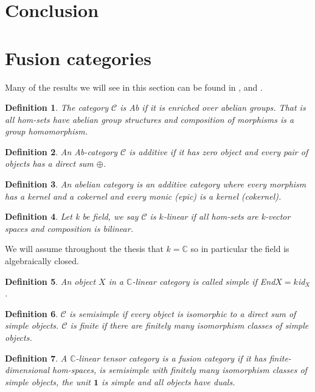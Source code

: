 \documentclass{article}
\newtheorem{definition}{Definition}
\begin{document}
\section{Conclusion}




\appendix
	\section{Fusion categories}
	Many of the results we will see in this section can be found in \cite{Mueger08}, \cite{Bartlett15} and \cite{Freyd66}.
	\begin{definition}
		The category $\mathcal{C}$ is Ab if it is enriched over abelian groups. That is all hom-sets have abelian group structures and composition of morphisms is a group homomorphism. 
	\end{definition}
	\begin{definition}
		An Ab-category $\mathcal{C}$ is additive if it has zero object and every pair of objects has a direct sum $\oplus$.
	\end{definition}
	\begin{definition}
		An abelian category is an additive category where every morphism has a kernel and a cokernel and every monic (epic) is a kernel (cokernel).
	\end{definition}
	\begin{definition}
		Let k be field, we say $\mathcal{C}$ is $k$-linear if all hom-sets are k-vector spaces and composition is bilinear.
	\end{definition}
	We will assume throughout the thesis that $k=\mathbb{C}$ so in particular the field is algebraically closed. 
	\begin{definition}
		An object $X$ in a $\mathbb{C}$-linear category is called simple if End$X=k$id$_X$.
	\end{definition}
	\begin{definition}
		$\mathcal{C}$ is semisimple if every object is isomorphic to a direct sum of simple objects. $\mathcal{C}$ is finite if there are finitely many isomorphism classes of simple objects.
	\end{definition}
	\begin{definition}
		A $\mathbb{C}$-linear tensor category is a fusion category if it has finite-dimensional hom-spaces, is semisimple with finitely many isomorphism classes of simple objects, the unit $\mathbf{1}$ is simple  and all objects have duals.
	\end{definition}
	
\end{document}
